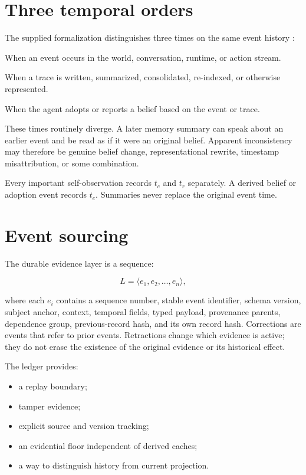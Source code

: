\documentclass[11pt,oneside]{report}
\newcommand{\tc}{t_{c}}
\newcommand{\tr}{t_{r}}
\newcommand{\te}{t_{e}}
\begin{document}
\section{Three temporal orders}

The supplied formalization distinguishes three times on the same event history \cite{directed-identity,phenom-form,path-essay}:

\begin{description}[leftmargin=1.25in,style=nextline]
  \item[Causal time $\tc$] When an event occurs in the world, conversation, runtime, or action stream.
  \item[Representational time $\tr$] When a trace is written, summarized, consolidated, re-indexed, or otherwise represented.
  \item[Epistemic time $\te$] When the agent adopts or reports a belief based on the event or trace.
\end{description}

These times routinely diverge. A later memory summary can speak about an earlier event and be read as if it were an original belief. Apparent inconsistency may therefore be genuine belief change, representational rewrite, timestamp misattribution, or some combination.

\begin{decisionbox}
Every important self-observation records $\tc$ and $\tr$ separately. A derived belief or adoption event records $\te$. Summaries never replace the original event time.
\end{decisionbox}

\section{Event sourcing}

The durable evidence layer is a sequence:

\[
L = \langle e_1,e_2,\ldots,e_n\rangle,
\]

where each $e_i$ contains a sequence number, stable event identifier, schema version, subject anchor, context, temporal fields, typed payload, provenance parents, dependence group, previous-record hash, and its own record hash. Corrections are events that refer to prior events. Retractions change which evidence is active; they do not erase the existence of the original evidence or its historical effect.

The ledger provides:

\begin{itemize}
  \item a replay boundary;
  \item tamper evidence;
  \item explicit source and version tracking;
  \item an evidential floor independent of derived caches;
  \item a way to distinguish history from current projection.
\end{itemize}
\end{document}
